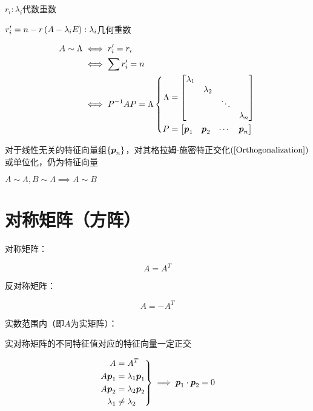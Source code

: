 \documentclass{article}
\begin{document}
$r_i:\lambda_i$代数重数

$r^\prime_i=n-r\left(A-\lambda_iE\right):\lambda_i$几何重数

\[\begin{aligned}
        A\sim\Lambda & \iff r^\prime_i=r_i   \\
                     & \iff\sum r^\prime_i=n \\
                     & \iff P^{-1}AP=\Lambda
        \left\{\begin{aligned}
                   \Lambda & =
                   \begin{bmatrix}
                \lambda_1 &           &        &           \\
                          & \lambda_2 &        &           \\
                          &           & \ddots &           \\
                          &           &        & \lambda_n
            \end{bmatrix}                      \\
                   P       & =\begin{bmatrix}\boldsymbol p_1&\boldsymbol p_2&\cdots&\boldsymbol p_n\end{bmatrix}
               \end{aligned}\right.
    \end{aligned}\]

对于线性无关的特征向量组$\left\{\boldsymbol p_n\right\}$，对其格拉姆-施密特正交化$\left(\ref{Orthogonalization}\right)$或单位化，仍为特征向量

$A\sim\Lambda,B\sim\Lambda\implies A\sim B$

\section{对称矩阵（方阵）}

\begin{definition}
    对称矩阵：

    \[A=A^T\]

    反对称矩阵：

    \[A=-A^T\]
\end{definition}

实数范围内（即$A$为实矩阵）：

实对称矩阵的不同特征值对应的特征向量一定正交

\[\left.\begin{aligned}
        A         & =A^T            \\
        A\boldsymbol p_1    & =\lambda_1\boldsymbol p_1 \\
        A\boldsymbol p_2    & =\lambda_2\boldsymbol p_2 \\
        \lambda_1 & \neq\lambda_2
    \end{aligned}\right\}
    \implies \boldsymbol p_1\cdot\boldsymbol p_2=0\]
\end{document}
